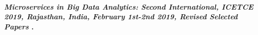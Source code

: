 
\paragraph{
    \textbf{\emph{Microservices in Big Data Analytics: Second International, {ICETCE} 2019, Rajasthan, India, February 1st-2nd 2019, Revised Selected Papers}
    }
    \cite{chaudhary_microservices_2020}.
}




